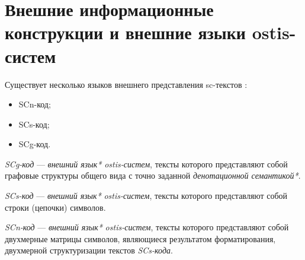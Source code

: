 \section{Внешние информационные конструкции и внешние языки ostis-систем}
\label{sec_external_information_constructs_external_lang}

Существует несколько языков внешнего представления sc-текстов :

\begin{itemize}
    \item SCn-код;
    \item SCs-код;
    \item SCg-код.
\end{itemize}

\textit{SCg-код} --- \textit{внешний язык*} \textit{ostis-систем}, тексты которого представляют собой графовые структуры общего вида с точно заданной \textit{денотационной семантикой*}.

\begin{SCn}

    \begin{scnindent}
    \end{scnindent}

\end{SCn}

\textit{SCs-код} --- \textit{внешний язык*} \textit{ostis-систем}, тексты которого представляют собой строки (цепочки) символов.

\begin{SCn}

    \begin{scnindent}
    \end{scnindent}

\end{SCn}

\textit{SCn-код} --- \textit{внешний язык*} \textit{ostis-систем}, тексты которого представляют собой двухмерные матрицы символов, являющиеся результатом форматирования, двухмерной структуризации текстов \textit{SCs-кода}.

\begin{SCn}

    \begin{scnindent}
    \end{scnindent}

\end{SCn}

